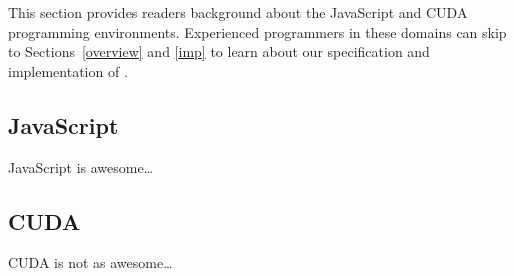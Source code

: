 
This section provides readers background about the JavaScript and CUDA
programming environments. Experienced programmers in these domains can skip to
Sections~\ref{overview} and \ref{imp} to learn about our specification and
implementation of \name.

\subsection{JavaScript}
JavaScript is awesome\ldots

\subsection{CUDA}
CUDA is not as awesome\ldots



